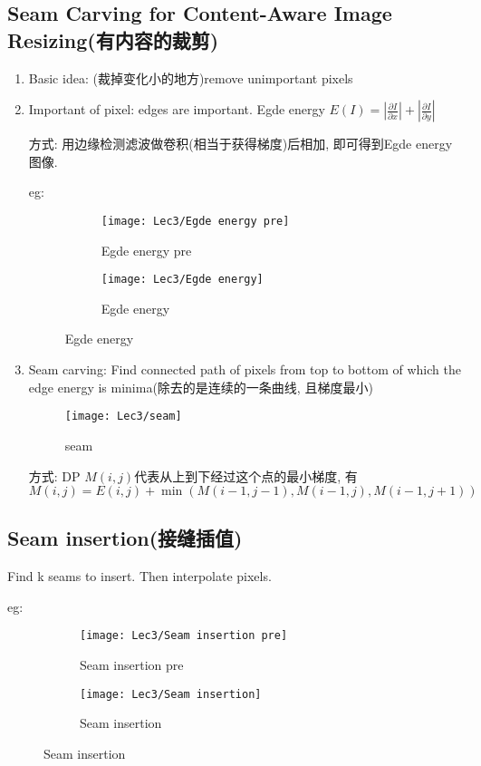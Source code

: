\subsection{Seam Carving for Content-Aware Image Resizing(有内容的裁剪)}
\begin{enumerate}
    \item Basic idea: (裁掉变化小的地方)remove unimportant pixels
    \item Important of pixel: edges are important. Egde energy $E(I)=\left|\frac{\partial I}{\partial x}\right|+\left|\frac{\partial I}{\partial y}\right|$
    
    方式: 用边缘检测滤波做卷积(相当于获得梯度)后相加, 即可得到Egde energy图像.

    eg:
    \begin{figure}[H]
        \centering
        \begin{subfigure}{0.38\textwidth}
            \centering
            \texttt{[image: Lec3/Egde energy pre]}
            \caption{Egde energy pre}
        \end{subfigure}
        \begin{subfigure}{0.38\textwidth}
            \centering
            \texttt{[image: Lec3/Egde energy]}
            \caption{Egde energy}
        \end{subfigure}
    \end{figure}
    \item Seam carving: Find connected path of pixels from top to bottom of which the edge energy is minima(除去的是连续的一条曲线, 且梯度最小)
    \begin{figure}[H]
        \centering
        \texttt{[image: Lec3/seam]}
        \caption{seam}
    \end{figure}
    方式: DP $M(i,j)$代表从上到下经过这个点的最小梯度, 有$M(i,j)=E(i,j)+\min(M(i-1,j-1),M(i-1,j),M(i-1,j+1))$
\end{enumerate}

\subsection{Seam insertion(接缝插值)}
Find k seams to insert. Then interpolate pixels.

eg:
\begin{figure}[H]
    \centering
    \begin{subfigure}{0.38\textwidth}
        \centering
        \texttt{[image: Lec3/Seam insertion pre]}
        \caption{Seam insertion pre}
    \end{subfigure}
    \begin{subfigure}{0.38\textwidth}
        \centering
        \texttt{[image: Lec3/Seam insertion]}
        \caption{Seam insertion}
    \end{subfigure}
\end{figure}